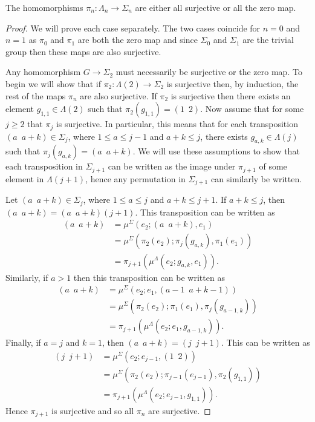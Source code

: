 \documentclass{amsbook} %
\numberwithin{section}{chapter}
\begin{document}
\begin{prop}\label{surjortriv}
The homomorphisms $\pi_n \colon \Lambda_n \to \Sigma_n$ are either all surjective or all the zero map.
\end{prop}
\begin{proof}
We will prove each case separately. The two cases coincide for $n = 0$ and $n = 1$ as $\pi_0$ and $\pi_1$ are both the zero map and since $\Sigma_0$ and $\Sigma_1$ are the trivial group then these maps are also surjective.

Any homomorphism $G \rightarrow \Sigma_2$ must necessarily be surjective or the zero map. To begin we will show that if $\pi_2 \colon \Lambda(2) \rightarrow \Sigma_2$ is surjective then, by induction, the rest of the maps $\pi_n$ are also surjective. If $\pi_2$ is surjective then there exists an element $g_{1,1} \in \Lambda(2)$ such that $\pi_2(g_{1,1}) = (1 \,\,\, 2)$. Now assume that for some $j \geq 2$ that $\pi_j$ is surjective. In particular, this means that for each transposition $(a \,\,\, a + k) \in \Sigma_j$, where $1 \leq a \leq j-1$ and $a + k \leq j$, there exists $g_{a,k} \in \Lambda(j)$ such that $\pi_j(g_{a,k}) = (a \,\,\, a + k)$. We will use these assumptions to show that each transposition in $\Sigma_{j+1}$ can be written as the image under $\pi_{j+1}$ of some element in $\Lambda(j+1)$, hence any permutation in $\Sigma_{j+1}$ can similarly be written.


Let $(a \,\,\, a +k) \in \Sigma_j$, where $1 \leq a \leq j$ and $a + k \leq j+1$. If $a + k \leq j$, then $(a \,\,\, a + k) = (a \,\,\, a + k)(j + 1)$. This transposition can be written as
  \begin{align*}
    (a \,\,\, a + k) &= \mu^{\Sigma}(e_2 ; (a \,\,\, a + k), e_1) \\
              &= \mu^{\Sigma}(\pi_2(e_2); \pi_j(g_{a,k}), \pi_1(e_1)) \\
              &= \pi_{j+1}\left(\mu^{\Lambda}(e_2; g_{a,k},e_1)\right).
  \end{align*}
Similarly, if $a > 1$ then this transposition can be written as
  \begin{align*}
    (a \,\,\, a + k) &= \mu^{\Sigma}(e_2 ; e_1, (a-1 \,\,\, a + k-1)) \\
              &= \mu^{\Sigma}(\pi_2(e_2); \pi_1(e_1), \pi_j(g_{a-1,k})) \\
              &= \pi_{j+1}\left(\mu^{\Lambda}(e_2; e_1, g_{a-1,k})\right).
  \end{align*}
Finally, if $a = j$ and $k = 1$, then $(a \,\,\, a + k) = (j \,\,\, j + 1)$. This can be written as
  \begin{align*}
    (j \,\,\, j + 1) &= \mu^{\Sigma}(e_2 ; e_{j-1}, (1 \,\,\, 2)) \\
              &= \mu^{\Sigma}(\pi_2(e_2); \pi_{j-1}(e_{j-1}), \pi_2(g_{1,1})) \\
              &= \pi_{j+1}\left(\mu^{\Lambda}(e_2; e_{j-1}, g_{1,1})\right).
  \end{align*}
Hence $\pi_{j+1}$ is surjective and so all $\pi_n$ are surjective.


\end{proof}
\end{document}
